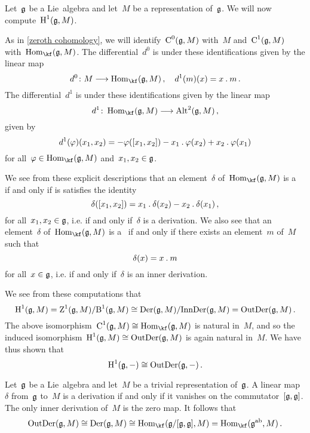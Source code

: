 \begin{fluff}
	Let~$\mathfrak{g}$ be a Lie~algebra and let~$M$ be a representation of~$\mathfrak{g}$.
	We will now compute~$\operatorname{H}^1(\mathfrak{g}, M)$.
	
	As in \cref{zeroth cohomology}, we will identify~$\operatorname{C}^0(\mathfrak{g}, M)$ with~$M$ and~$\operatorname{C}^1(\mathfrak{g}, M)$ with~$\Hom_{\kf}(\glie, M)$.
	The differential~$d^0$ is under these identifications given by the linear map
	\[
		d^0
		\colon
		M
		\to
		\Hom_{\kf}(\glie, M) \,,
		\quad
		d^1(m)(x)
		=
		x \act m \,.
	\]
	The differential~$d^1$ is under these identifications given by the linear map
	\[
		d^1
		\colon
		\Hom_{\kf}(\glie, M)
		\to
		\Alt^2(\glie, M) \,,
	\]
	given by
	\[
		d^1(\varphi)(x_1, x_2)
		=
		- \varphi( [x_1, x_2] )
		- x_1 \mathbin{.} \varphi(x_2)
		+ x_2 \mathbin{.} \varphi(x_1)
	\]
	for all~$\varphi \in \Hom_{\kf}(\glie, M)$ and~$x_1, x_2 \in \mathfrak{g}$.

	We see from these explicit descriptions that an element~$\delta$ of~$\Hom_{\kf}(\glie, M)$ is a~ if and only if is satisfies the identity
	\[
		\delta( [x_1, x_2] )
		=
		x_1 \mathbin{.} \delta(x_2) - x_2 \mathbin{.} \delta(x_1) \,,
	\]
	for all~$x_1, x_2 \in \mathfrak{g}$, i.e. if and only if~$\delta$ is a derivation.
	We also see that an element~$\delta$ of~$\Hom_{\kf}(\glie, M)$ is a~ if and only if there exists an element~$m$ of~$M$ such that
	\[
		\delta(x)
		=
		x \mathbin{.} m
	\]
	for all~$x \in \mathfrak{g}$, i.e. if and only if~$\delta$ is an inner derivation.
	
	We see from these computations that
	\[
		\operatorname{H}^1(\mathfrak{g}, M)
		=
		\operatorname{Z}^1(\mathfrak{g}, M) / {\operatorname{B}^1(\mathfrak{g}, M)}
		\cong
		\operatorname{Der}(\mathfrak{g}, M) / {\operatorname{InnDer}(\mathfrak{g}, M)}
		=
		\operatorname{OutDer}(\mathfrak{g}, M) \,.
	\]
	The above isomorphism~$\Chain^1(\glie, M) \cong \Hom_{\kf}(\glie, M)$ is natural in~$M$, and so the induced isomorphism~$\operatorname{H}^1(\mathfrak{g}, M) \cong \operatorname{OutDer}(\mathfrak{g}, M)$ is again natural in~$M$.
	We have thus shown that
	\[
		\operatorname{H}^1(\mathfrak{g}, -)
		\cong
		\operatorname{OutDer}(\mathfrak{g}, -) \,.
	\]
\end{fluff}


\begin{example}
	Let~$\mathfrak{g}$ be a Lie~algebra and let~$M$ be a trivial representation of~$\mathfrak{g}$.
	A linear map~$\delta$ from~$\mathfrak{g}$ to~$M$ is a derivation if and only if it vanishes on the commutator~$[\mathfrak{g}, \mathfrak{g}]$.
	The only inner derivation of~$M$ is the zero map.
	It follows that
	\[
		\OutDer(\glie, M)
		\cong
		\Der(\glie, M)
		\cong
		\Hom_{\kf}( \glie / [\glie, \glie], M )
		=
		\Hom_{\kf}( \glie^{\ab},  M ) \,.
	\]
\end{example}



